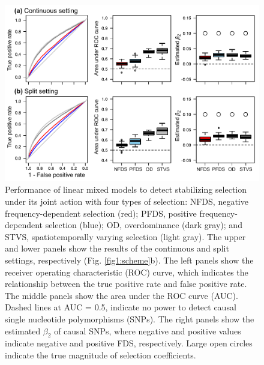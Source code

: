 \documentclass[12pt,]{article}
\begin{document}
\begin{figure}[]
  \includegraphics[width=\linewidth]{FigS6_beta1LMMdomi.pdf}
  \caption{Performance of linear mixed models to detect stabilizing selection under its joint action with four types of selection: NFDS, negative frequency-dependent selection (red); PFDS, positive frequency-dependent selection (blue); OD, overdominance (dark gray); and STVS, spatiotemporally varying selection (light gray). The upper and lower panels show the results of the continuous and split settings, respectively (Fig. \ref{fig1:scheme}b). The left panels show the receiver operating characteristic (ROC) curve, which indicates the relationship between the true positive rate and false positive rate. The middle panels show the area under the ROC curve (AUC). Dashed lines at AUC = 0.5, indicate no power to detect causal single nucleotide polymorphisms (SNPs). The right panels show the estimated $\beta_2$ of causal SNPs, where negative and positive values indicate negative and positive FDS, respectively. Large open circles indicate the true magnitude of selection coefficients.}
  \label{figS6:beta1LMM}
\end{figure}
\end{document}
